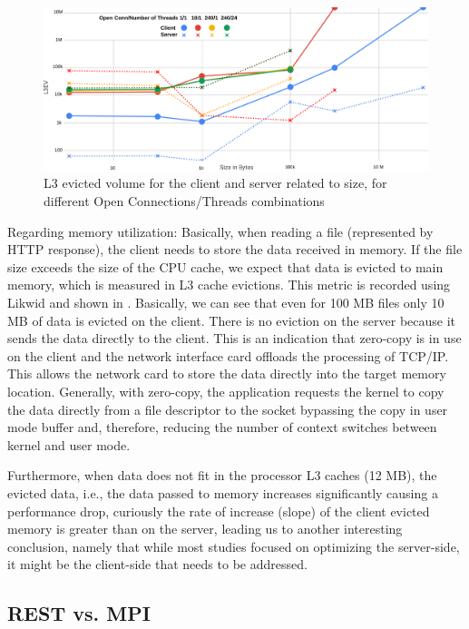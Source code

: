 \documentclass[runningheads]{llncs}
\begin{document}
\begin{figure}
\includegraphics[width=\textwidth]{l3ev-to-size.png}
\caption{L3 evicted volume for the client and server related to size, for different Open Connections/Threads combinations}
\label{fig:l3ev-to-size}
\end{figure}

Regarding memory utilization: Basically, when reading a file (represented by HTTP response), the client needs to store the data received in memory. If the file size exceeds the size of the CPU cache, we expect that data is evicted to main memory, which is measured in L3 cache evictions. This metric is recorded using Likwid and shown in . Basically, we can see that even for 100 MB files only 10 MB of data is evicted on the client. There is no eviction on the server because it sends the data directly to the client. This is an indication that zero-copy \cite{zerocopy} is in use on the client and the network interface card offloads the processing of TCP/IP. This allows  the network card to store the data directly into the target memory location. Generally, with zero-copy, the application requests the kernel to copy the data directly from a file descriptor to the socket bypassing the copy in user mode buffer and, therefore, reducing the number of context switches between kernel and user mode.


Furthermore, when data does not fit in the processor L3 caches (12 MB), the evicted data, i.e., the data passed to memory increases significantly causing a performance drop, curiously the rate of increase (slope) of the client evicted memory is greater than on the server, leading us to another interesting conclusion, namely that while most studies focused on optimizing the server-side, it might be the client-side that needs to be addressed.

\subsection{REST vs. MPI}\label{subsec:tcpib}
\end{document}
